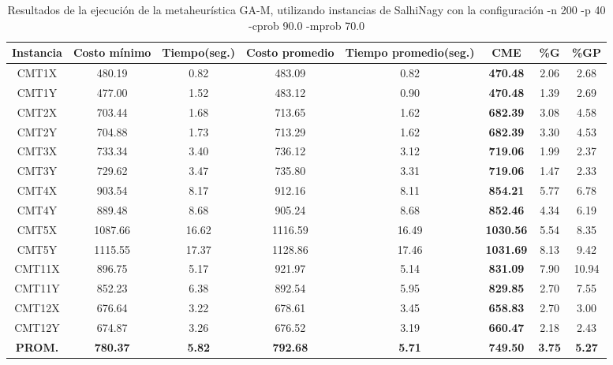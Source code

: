 \begin{table}[h]
\caption{Resultados de la ejecución de la metaheurística GA-M, utilizando instancias de SalhiNagy con la configuración -n 200 -p 40 -cprob 90.0 -mprob 70.0}
\centering
\small
\begin{tabular}{c c c c c c c c}
\hline\hline
Instancia & Costo mínimo & Tiempo(seg.) & Costo promedio & Tiempo promedio(seg.) & CME & \%G & \%GP \\ [0.5ex]
\hline
CMT1X & 480.19 & 0.82 & 
483.09 & 0.82 & \bf{470.48} & 
2.06 & 2.68\\CMT1Y & 477.00 & 1.52 & 
483.12 & 0.90 & \bf{470.48} & 
1.39 & 2.69\\CMT2X & 703.44 & 1.68 & 
713.65 & 1.62 & \bf{682.39} & 
3.08 & 4.58\\CMT2Y & 704.88 & 1.73 & 
713.29 & 1.62 & \bf{682.39} & 
3.30 & 4.53\\CMT3X & 733.34 & 3.40 & 
736.12 & 3.12 & \bf{719.06} & 
1.99 & 2.37\\CMT3Y & 729.62 & 3.47 & 
735.80 & 3.31 & \bf{719.06} & 
1.47 & 2.33\\CMT4X & 903.54 & 8.17 & 
912.16 & 8.11 & \bf{854.21} & 
5.77 & 6.78\\CMT4Y & 889.48 & 8.68 & 
905.24 & 8.68 & \bf{852.46} & 
4.34 & 6.19\\CMT5X & 1087.66 & 16.62 & 
1116.59 & 16.49 & \bf{1030.56} & 
5.54 & 8.35\\CMT5Y & 1115.55 & 17.37 & 
1128.86 & 17.46 & \bf{1031.69} & 
8.13 & 9.42\\CMT11X & 896.75 & 5.17 & 
921.97 & 5.14 & \bf{831.09} & 
7.90 & 10.94\\CMT11Y & 852.23 & 6.38 & 
892.54 & 5.95 & \bf{829.85} & 
2.70 & 7.55\\CMT12X & 676.64 & 3.22 & 
678.61 & 3.45 & \bf{658.83} & 
2.70 & 3.00\\CMT12Y & 674.87 & 3.26 & 
676.52 & 3.19 & \bf{660.47} & 
2.18 & 2.43\\\bf{PROM.} & 
\bf{780.37} & \bf{5.82} & \bf{792.68} & \bf{5.71} & \bf{749.50} & \bf{3.75} & \bf{5.27}\\[1ex]\hline
\end{tabular}
\label{table:nonlin}
\end{table}

